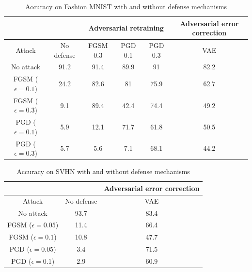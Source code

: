 \documentclass[journal]{IEEEtran}
\begin{document}
\begin{table}[t]
	\caption{Accuracy on Fashion MNIST with and without defense mechanisms}
	\centering
	\begin{tabular}{c|c|ccc|c}
		\toprule
		& & \multicolumn{3}{c|}{Adversarial retraining} & Adversarial error correction
		\\
		\midrule
		Attack & No defense & FGSM 0.3 & PGD 0.1 & PGD 0.3 & VAE
		\\
		\midrule
		No attack & 91.2 & 91.4 & 89.9 & 91 & 82.2
		\\
		FGSM ($\epsilon = 0.1$) & 24.2 & 82.6 & 81 & 75.9 & 62.7
		\\
		FGSM ($\epsilon = 0.3$) & 9.1 & 89.4 & 42.4 & 74.4 & 49.2
		\\
		PGD ($\epsilon = 0.1$) & 5.9 & 12.1 & 71.7 & 61.8 & 50.5
		\\
		PGD ($\epsilon = 0.3$) & 5.7 & 5.6 & 7.1 & 68.1 & 44.2
		\\
		\bottomrule
	\end{tabular}
	\label{tab: cnnconv}
\end{table}

\begin{table}[t]
	\caption{Accuracy on SVHN with and without defense mechanisms}
	\centering
	\begin{tabular}{c|c|c}
		\toprule
		& & Adversarial error correction
		\\
		\midrule
		Attack & No defense & VAE
		\\
		\midrule
		No attack & 93.7 & 83.4
		\\
		FGSM ($\epsilon = 0.05$) & 11.4 & 66.4
		\\
		FGSM ($\epsilon = 0.1$) & 10.8 & 47.7
		\\
		PGD ($\epsilon = 0.05$) & 3.4 & 71.5
		\\
		PGD ($\epsilon = 0.1$) & 2.9 & 60.9
		\\
		\bottomrule
	\end{tabular}
	\label{tab: cnnconv}
\end{table}
\end{document}
